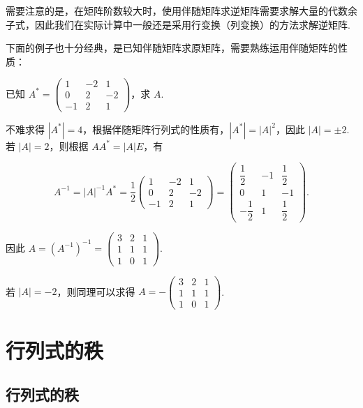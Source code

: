 需要注意的是，在矩阵阶数较大时，使用伴随矩阵求逆矩阵需要求解大量的代数余子式，因此我们在实际计算中一般还是采用行变换（列变换）的方法求解逆矩阵.

下面的例子也十分经典，是已知伴随矩阵求原矩阵，需要熟练运用伴随矩阵的性质：
\begin{example}{}{}
    已知 $A^*=\begin{pmatrix}
            1 & -2 & 1 \\ 0 & 2 & -2 \\ -1 & 2 & 1
        \end{pmatrix}$，求 $A$.
\end{example}

\begin{solution}
    不难求得 $|A^*| = 4$，根据伴随矩阵行列式的性质有，$|A^*| = |A|^2$，因此 $|A| = \pm 2$. 若 $|A| = 2$，则根据 $AA^* = |A|E$，有

    \[A^{-1} = |A|^{-1}A^* = \frac{1}{2}\begin{pmatrix}
            1 & -2 & 1 \\ 0 & 2 & -2 \\ -1 & 2 & 1
        \end{pmatrix} = \begin{pmatrix}
            \dfrac{1}{2} & -1 & \dfrac{1}{2} \\ 0 & 1 & -1 \\ -\dfrac{1}{2} & 1 & \dfrac{1}{2}
        \end{pmatrix}.\]

    因此 $A = (A^{-1})^{-1} = \begin{pmatrix}
            3 & 2 & 1 \\ 1 & 1 & 1 \\ 1 & 0 & 1
        \end{pmatrix}$.

    若 $|A| = -2$，则同理可以求得 $A = -\begin{pmatrix}
            3 & 2 & 1 \\ 1 & 1 & 1 \\ 1 & 0 & 1
        \end{pmatrix}$.
\end{solution}

\section{行列式的秩}

\subsection{行列式的秩}

